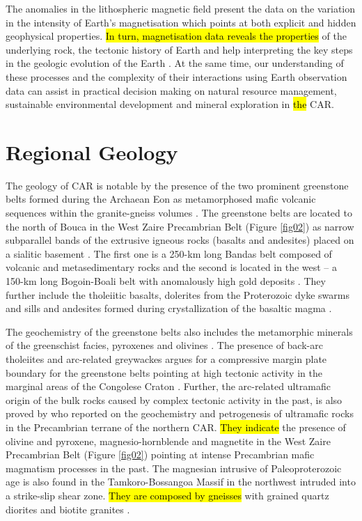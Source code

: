 \documentclass[minerals,article,submit,pdftex,moreauthors]{Definitions/mdpi}
\begin{document}
The anomalies in the lithospheric magnetic field present the data on the variation in the intensity of Earth's magnetisation which points at both explicit and hidden geophysical properties. \hl{In turn, magnetisation data reveals the properties }of the underlying rock, the tectonic history of Earth and help interpreting the key steps in the geologic evolution of the Earth \cite{Vervelidou}. At the same time, our understanding of these processes and the complexity of their interactions using Earth observation data can assist in practical decision making on natural resource management, sustainable environmental development and mineral exploration in \hl{the} CAR. 

\section{Regional Geology} 

The geology of CAR is notable by the presence of the two prominent greenstone belts formed during the Archaean Eon as  metamorphosed mafic volcanic sequences within the granite-gneiss volumes \cite{Poidevin1991LesCD}. The greenstone belts are located to the north of Bouca in the West Zaire Precambrian Belt (Figure \ref{fig02}) as narrow subparallel bands of the extrusive igneous rocks (basalts and andesites) placed on a sialitic basement \cite{Boulvert1983}. The first one is a 250-km long Bandas belt composed of volcanic and metasedimentary rocks \cite{POIDEVIN1981157} and the second is located in the west -- a 150-km long Bogoin-Boali belt with anomalously high gold deposits \cite{Dostal}. They further include the tholeiitic basalts, dolerites from the Proterozoic dyke swarms and sills and andesites formed during crystallization of the basaltic magma \cite{Poidevin1985}. 

The geochemistry of the greenstone belts also includes the metamorphic minerals of the greenschist facies, pyroxenes and olivines \cite{POIDEVIN199497}. The presence of back-arc tholeiites and arc-related greywackes argues for a compressive margin plate boundary for the greenstone belts pointing at high tectonic activity in the marginal areas of the Congolese Craton \cite{cornacchia1989existence}. Further, the arc-related ultramafic origin of the bulk rocks caused by complex tectonic activity in the past, is also proved by \cite{Tanko} who reported on the geochemistry and petrogenesis of ultramafic rocks in the Precambrian terrane of the northern CAR. \hl{They indicate} the presence of olivine and pyroxene, magnesio-hornblende and magnetite in the West Zaire Precambrian Belt (Figure \ref{fig02}) pointing at intense Precambrian mafic magmatism processes in the past. The magnesian intrusive of Paleoproterozoic age is also found in the Tamkoro-Bossangoa Massif in the northwest intruded into a strike-slip shear zone. \hl{They are composed by gneisses} with grained quartz diorites and biotite granites \cite{jgg2014243}.
\end{document}
